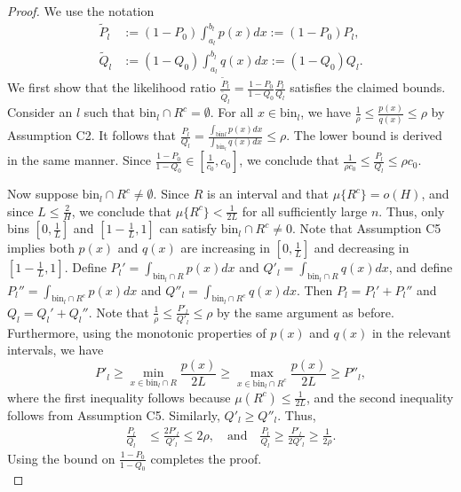 \documentclass{article}
\newcommand{\bin}{\text{bin}}
\begin{document}
\begin{proof}
We use the notation
\begin{align*}
\tilde P_l & := (1- P_0) \int_{a_l}^{b_l} p(x) dx := (1-P_0) P_l, \\
\tilde Q_l & := (1-Q_0)\int_{a_l}^{b_l} q(x) dx := (1-Q_0) Q_l.
\end{align*}
We first show that the likelihood ratio $\frac{\tilde P_l}{\tilde Q_l} = \frac{1-P_0}{1-Q_0} \frac{P_l}{Q_l}$ satisfies the claimed bounds. Consider an $l$ such that $\bin_l \cap R^c = \emptyset$. For all $x \in \bin_l$, we have $\frac{1}{\rho} \leq \frac{p(x)}{q(x)} \leq \rho$ by Assumption C2. It follows that $\frac{P_l}{Q_l} = \frac{\int_{\bin l} p(x)dx}{\int_{\bin_l} q(x)dx} \leq \rho.$ The lower bound is derived in the same manner. Since $\frac{1-P_0}{1-Q_0} \in \left[\frac{1}{c_0}, c_0\right]$, we conclude that $\frac{1}{\rho c_0} \le \frac{P_l}{Q_l} \le \rho c_0$.

Now suppose $\bin_l \cap R^c \neq \emptyset$. Since $R$ is an interval and that $\mu\{R^c\} = o(H)$, and since $L \leq \frac{2}{H}$, we conclude that $\mu\{R^c\} < \frac{1}{2L}$ for all sufficiently large $n$. Thus, only bins $[0, \frac{1}{L}]$ and $[1-\frac{1}{L}, 1]$ can satisfy $\bin_l \cap R^c \neq 0$. Note that Assumption C5 implies both $p(x)$ and $q(x)$ are increasing in $\left[0, \frac{1}{L}\right]$ and decreasing in $\left[1-\frac{1}{L}, 1\right]$. Define $P_l' = \int_{\bin_l \cap R} p(x) dx$ and $Q'_l = \int_{\bin_l \cap R} q(x) dx$, and define $P_l'' = \int_{\bin_l \cap R^c} p(x) dx$ and $Q''_l = \int_{\bin_l \cap R^c} q(x) dx$. Then $P_l = P_l' + P_l''$ and $Q_l = Q_l' + Q_l''$. Note that $\frac{1}{\rho} \leq \frac{P'_l}{Q'_l} \leq \rho$ by the same argument as before. Furthermore, using the monotonic properties of $p(x)$ and $q(x)$ in the relevant intervals, we have
\[
P'_l \geq \min_{x \in \bin_l \cap R} \frac{p(x)}{2L} \geq \max_{x \in \bin_l \cap R^c} \frac{p(x)}{2L} \geq P''_l,
\]
where the first inequality follows because $\mu(R^c) \leq \frac{1}{2L}$, and the second inequality follows from Assumption C5. Similarly, $Q'_l \geq Q''_l$. Thus,
\begin{align*}
\frac{P_l}{Q_l} &\leq \frac{2 P'_l}{ Q'_l} \leq 2\rho, \quad \text{and} \quad \frac{P_l}{Q_l} \geq \frac{P'_l}{2 Q'_l} \geq \frac{1}{2\rho}.
\end{align*}
Using the bound on $\frac{1-P_0}{1-Q_0}$ completes the proof.\\


\end{proof}
\end{document}
